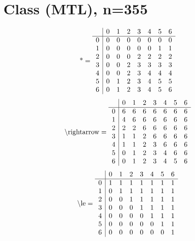 \documentclass[11pt]{article}
\begin{document}
\section{Class (MTL), n=355}
\[\text{*} = 
\begin{array}{r | r r r r r r r}
 & 0 & 1 & 2 & 3 & 4 & 5 & 6 \\ \hline
0 & 0 & 0 & 0 & 0 & 0 & 0 & 0 \\
1 & 0 & 0 & 0 & 0 & 0 & 1 & 1 \\
2 & 0 & 0 & 0 & 2 & 2 & 2 & 2 \\
3 & 0 & 0 & 2 & 3 & 3 & 3 & 3 \\
4 & 0 & 0 & 2 & 3 & 4 & 4 & 4 \\
5 & 0 & 1 & 2 & 3 & 4 & 5 & 5 \\
6 & 0 & 1 & 2 & 3 & 4 & 5 & 6 \\
\end{array}
\]
\[\text{\textbackslash rightarrow} = 
\begin{array}{r | r r r r r r r}
 & 0 & 1 & 2 & 3 & 4 & 5 & 6 \\ \hline
0 & 6 & 6 & 6 & 6 & 6 & 6 & 6 \\
1 & 4 & 6 & 6 & 6 & 6 & 6 & 6 \\
2 & 2 & 2 & 6 & 6 & 6 & 6 & 6 \\
3 & 1 & 1 & 2 & 6 & 6 & 6 & 6 \\
4 & 1 & 1 & 2 & 3 & 6 & 6 & 6 \\
5 & 0 & 1 & 2 & 3 & 4 & 6 & 6 \\
6 & 0 & 1 & 2 & 3 & 4 & 5 & 6 \\
\end{array}
\]
\[\text{\textbackslash le} = 
\begin{array}{r | r r r r r r r}
 & 0 & 1 & 2 & 3 & 4 & 5 & 6 \\ \hline
0 & 1 & 1 & 1 & 1 & 1 & 1 & 1 \\
1 & 0 & 1 & 1 & 1 & 1 & 1 & 1 \\
2 & 0 & 0 & 1 & 1 & 1 & 1 & 1 \\
3 & 0 & 0 & 0 & 1 & 1 & 1 & 1 \\
4 & 0 & 0 & 0 & 0 & 1 & 1 & 1 \\
5 & 0 & 0 & 0 & 0 & 0 & 1 & 1 \\
6 & 0 & 0 & 0 & 0 & 0 & 0 & 1 \\
\end{array}
\]
\end{document}
